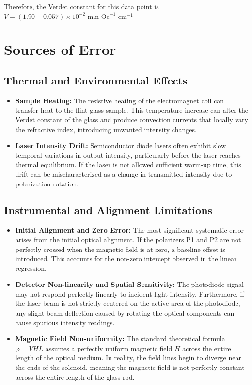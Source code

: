 Therefore, the Verdet constant for this data point is $V = (1.90 \pm 0.057)\times 10^{-2} \text{ min Oe}^{-1} \text{ cm}^{-1}$

\section{Sources of Error}

\subsection{Thermal and Environmental Effects}
\begin{itemize}
    \item \textbf{Sample Heating:} The resistive heating of the electromagnet coil can transfer heat to the flint glass sample. This temperature increase can alter the Verdet constant of the glass and produce convection currents that locally vary the refractive index, introducing unwanted intensity changes.
    \item \textbf{Laser Intensity Drift:} Semiconductor diode lasers often exhibit slow temporal variations in output intensity, particularly before the laser reaches thermal equilibrium. If the laser is not allowed sufficient warm-up time, this drift can be mischaracterized as a change in transmitted intensity due to polarization rotation.
\end{itemize}

\subsection{Instrumental and Alignment Limitations}
\begin{itemize}
    \item \textbf{Initial Alignment and Zero Error:} The most significant systematic error arises from the initial optical alignment. If the polarizers P1 and P2 are not perfectly crossed when the magnetic field is at zero, a baseline offset is introduced. This accounts for the non-zero intercept observed in the linear regression.
    \item \textbf{Detector Non-linearity and Spatial Sensitivity:} The photodiode signal may not respond perfectly linearly to incident light intensity. Furthermore, if the laser beam is not strictly centered on the active area of the photodiode, any slight beam deflection caused by rotating the optical components can cause spurious intensity readings.
    \item \textbf{Magnetic Field Non-uniformity:} The standard theoretical formula $\varphi = VHL$ assumes a perfectly uniform magnetic field $H$ across the entire length of the optical medium. In reality, the field lines begin to diverge near the ends of the solenoid, meaning the magnetic field is not perfectly constant across the entire length of the glass rod.
\end{itemize}

